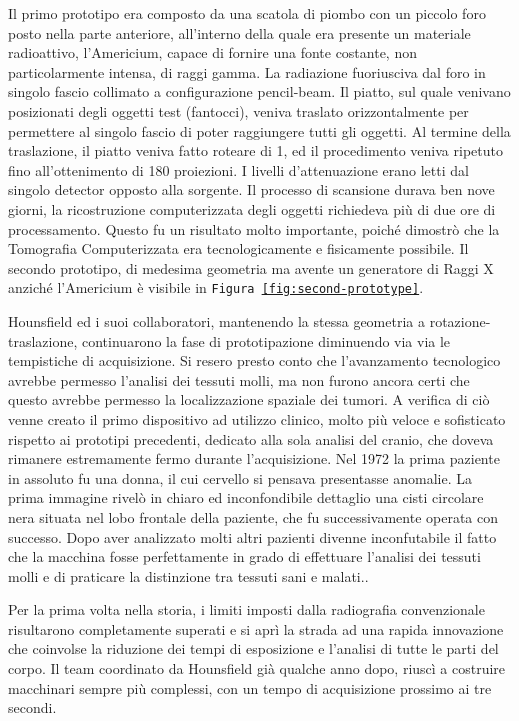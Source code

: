 \documentclass[a4paper,12pt, doubleside]{report}
\begin{document}
                    Il primo prototipo era composto da una scatola di piombo con un piccolo foro posto nella parte anteriore, all’interno della quale era presente un materiale radioattivo, l’Americium, capace di fornire una fonte costante, non particolarmente intensa, di raggi gamma. La radiazione fuoriusciva dal foro in singolo fascio collimato a configurazione pencil-beam. Il piatto, sul quale venivano posizionati degli oggetti test (fantocci), veniva traslato orizzontalmente per permettere al singolo fascio di poter raggiungere tutti gli oggetti. Al termine della traslazione, il piatto veniva fatto roteare di 1\degree, ed il procedimento veniva ripetuto fino all'ottenimento di 180 proiezioni. I livelli d'attenuazione erano letti dal singolo detector opposto alla sorgente. Il processo di scansione durava ben nove giorni, la ricostruzione computerizzata degli oggetti richiedeva più di due ore di processamento. Questo fu un risultato molto importante, poiché dimostrò che la Tomografia Computerizzata era tecnologicamente e fisicamente possibile. Il secondo prototipo, di medesima geometria ma avente un generatore di Raggi X anziché l’Americium è visibile in \texttt{Figura \ref{fig:second-prototype}}.
                
                \bigskip
                \par
                    Hounsfield ed i suoi collaboratori, mantenendo la stessa geometria a rotazione-traslazione, continuarono la fase di prototipazione diminuendo via via le tempistiche di acquisizione. Si resero presto conto che l'avanzamento tecnologico avrebbe permesso l'analisi dei tessuti molli, ma non furono ancora certi che questo avrebbe permesso la localizzazione spaziale dei tumori. A verifica di ciò venne creato il primo dispositivo ad utilizzo clinico, molto più veloce e sofisticato rispetto ai prototipi precedenti, dedicato alla sola analisi del cranio, che doveva rimanere estremamente fermo durante l'acquisizione. Nel 1972 la prima paziente in assoluto fu una donna, il cui cervello si pensava presentasse anomalie. La prima immagine rivelò in chiaro ed inconfondibile dettaglio una cisti circolare nera situata nel lobo frontale della paziente, che fu successivamente operata con successo. Dopo aver analizzato molti altri pazienti divenne inconfutabile il fatto che la macchina fosse perfettamente in grado di effettuare l'analisi dei tessuti molli e di praticare la distinzione tra tessuti sani e malati.\cite{hounsfield-nobel-lecture}.
                    
                \bigskip
                \par
                    Per la prima volta nella storia, i limiti imposti dalla radiografia convenzionale risultarono completamente superati e si aprì la strada ad una rapida innovazione che coinvolse la riduzione dei tempi di esposizione e l'analisi di tutte le parti del corpo. Il team coordinato da Hounsfield già qualche anno dopo, riuscì a costruire macchinari sempre più complessi, con un tempo di acquisizione prossimo ai tre secondi.
                            
\end{document}
